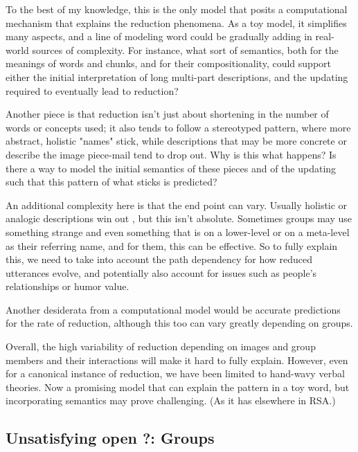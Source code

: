 \documentclass[]{article}
\begin{document}
To the best of my knowledge, this is the only model that posits a computational mechanism that explains the reduction phenomena. As a toy model, it simplifies many aspects, and a line of modeling word could be gradually adding in real-world sources of complexity. For instance, what sort of semantics, both for the meanings of words and chunks, and for their compositionality, could support either the initial interpretation of long multi-part descriptions, and the updating required to eventually lead to reduction? 

Another piece is that reduction isn't just about shortening in the number of words or concepts used; it also tends to follow a stereotyped pattern, where more abstract, holistic "names" stick, while descriptions that may be more concrete or describe the image piece-mail tend to drop out. Why is this what happens?  Is there a way to model the initial semantics of these pieces and of the updating such that this pattern of what sticks is predicted? 

An additional complexity here is that the end point can vary. Usually holistic or analogic descriptions win out \cite{clark1986}, but this isn't absolute. Sometimes groups may use something strange and even something that is on a lower-level or on a meta-level as their referring name, and for them, this can be effective. So to fully explain this, we need to take into account the path dependency for how reduced utterances evolve, and potentially also account for issues such as people's relationships or humor value. 

Another desiderata from a computational model would be accurate predictions for the rate of reduction, although this too can vary greatly depending on groups. 

Overall, the high variability of reduction depending on images and group members and their interactions will make it hard to fully explain. However, even for a canonical instance of reduction, we have been limited to hand-wavy verbal theories. Now a promising model that can explain the pattern in a toy word, but incorporating semantics may prove challenging. (As it has elsewhere in RSA.) 








\subsection{Unsatisfying open ?: Groups}
\end{document}
